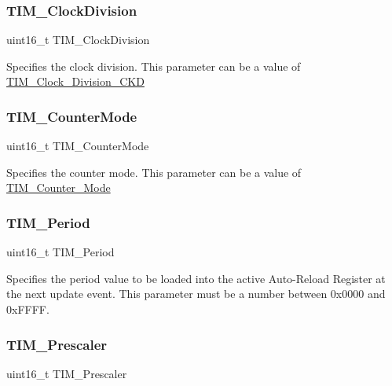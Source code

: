 \subsubsection{\texorpdfstring{TIM\_ClockDivision}{TIM\_ClockDivision}}
{\footnotesize\ttfamily uint16\+\_\+t T\+I\+M\+\_\+\+Clock\+Division}

Specifies the clock division. This parameter can be a value of \mbox{\hyperlink{group___t_i_m___clock___division___c_k_d}{T\+I\+M\+\_\+\+Clock\+\_\+\+Division\+\_\+\+C\+KD}} \mbox{\label{struct_t_i_m___time_base_init_type_def_adfc97c66bfce30e74ce779ab04c156e9}} 
\subsubsection{\texorpdfstring{TIM\_CounterMode}{TIM\_CounterMode}}
{\footnotesize\ttfamily uint16\+\_\+t T\+I\+M\+\_\+\+Counter\+Mode}

Specifies the counter mode. This parameter can be a value of \mbox{\hyperlink{group___t_i_m___counter___mode}{T\+I\+M\+\_\+\+Counter\+\_\+\+Mode}} \mbox{\label{struct_t_i_m___time_base_init_type_def_a169131a7437571cef140fd53a82cd0fc}} 
\subsubsection{\texorpdfstring{TIM\_Period}{TIM\_Period}}
{\footnotesize\ttfamily uint16\+\_\+t T\+I\+M\+\_\+\+Period}

Specifies the period value to be loaded into the active Auto-\/\+Reload Register at the next update event. This parameter must be a number between 0x0000 and 0x\+F\+F\+FF. \mbox{\label{struct_t_i_m___time_base_init_type_def_a30c6857997a4ddd7d3d66fd3a8907c37}} 
\subsubsection{\texorpdfstring{TIM\_Prescaler}{TIM\_Prescaler}}
{\footnotesize\ttfamily uint16\+\_\+t T\+I\+M\+\_\+\+Prescaler}

